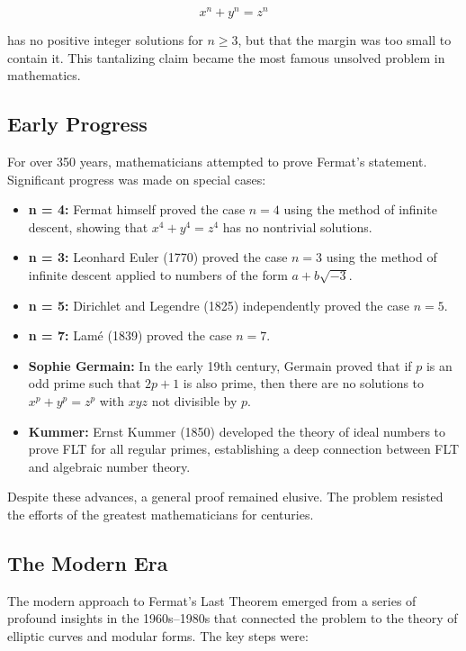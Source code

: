 \[
x^n + y^n = z^n
\]

has no positive integer solutions for \(n \geq 3\), but that the margin was too small to contain it. This tantalizing claim became the most famous unsolved problem in mathematics.

\subsection{Early Progress}

For over 350 years, mathematicians attempted to prove Fermat's statement. Significant progress was made on special cases:

\begin{itemize}
    \item \textbf{n = 4:} Fermat himself proved the case \(n = 4\) using the method of infinite descent, showing that \(x^4 + y^4 = z^4\) has no nontrivial solutions.
    \item \textbf{n = 3:} Leonhard Euler (1770) proved the case \(n = 3\) using the method of infinite descent applied to numbers of the form \(a + b\sqrt{-3}\).
    \item \textbf{n = 5:} Dirichlet and Legendre (1825) independently proved the case \(n = 5\).
    \item \textbf{n = 7:} Lam\'e (1839) proved the case \(n = 7\).
    \item \textbf{Sophie Germain:} In the early 19th century, Germain proved that if \(p\) is an odd prime such that \(2p+1\) is also prime, then there are no solutions to \(x^p + y^p = z^p\) with \(xyz\) not divisible by \(p\).
    \item \textbf{Kummer:} Ernst Kummer (1850) developed the theory of ideal numbers to prove FLT for all regular primes, establishing a deep connection between FLT and algebraic number theory.
\end{itemize}

Despite these advances, a general proof remained elusive. The problem resisted the efforts of the greatest mathematicians for centuries.

\subsection{The Modern Era}

The modern approach to Fermat's Last Theorem emerged from a series of profound insights in the 1960s--1980s that connected the problem to the theory of elliptic curves and modular forms. The key steps were:


